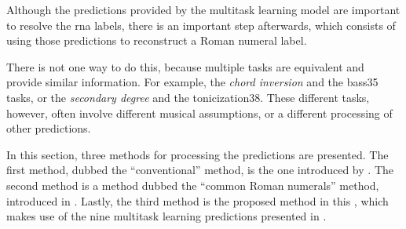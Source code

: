 
Although the predictions provided by the multitask learning
model are important to resolve the \gls{rna} labels, there
is an important step afterwards, which consists of using
those predictions to reconstruct a Roman numeral label.

There is not one way to do this, because multiple tasks are
equivalent and provide similar information. For example, the
\emph{chord inversion} and the \gls{bass35} tasks, or the
\emph{secondary degree} and the \gls{tonicization38}. These
different tasks, however, often involve different musical
assumptions, or a different processing of other predictions.

In this section, three methods for processing the
predictions are presented. The first method, dubbed the
``conventional'' method, is the one introduced by
\textcite{chen2018functional}. The second method is a method
dubbed the ``common Roman numerals'' method, introduced in
\textcite{napoleslopez2021augmentednet}. Lastly, the third
method is the proposed method in this \thesisdiss{}, which
makes use of the nine multitask learning predictions
presented in .


